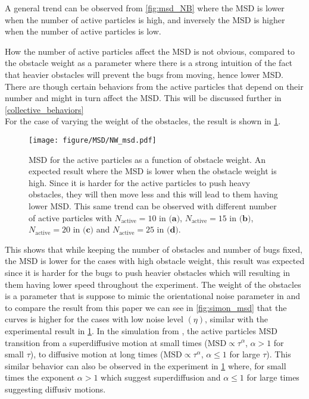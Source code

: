A general trend can be observed from \cref{fig:msd_NB} where the MSD is lower 
when the number of active particles is high, and inversely the MSD is higher 
when the number of active particles is low.

How the number of active particles affect the MSD is not obvious, compared to the 
obstacle weight as a parameter where there is a strong intuition of the fact that 
heavier obstacles will prevent the bugs from moving, hence lower MSD. 
There are though certain behaviors from the active particles that depend on 
their number and might in turn affect the MSD. This will be discussed further in 
\cref{collective_behaviors}\\

For the case of varying the weight of the obstacles, the result is shown in \cref{fig:msd_NW}.

\begin{figure}[htbp]
    \centering
    \texttt{[image: figure/MSD/NW\_msd.pdf]}
    \caption{MSD for the active particles as a function of obstacle weight. An 
    expected result where the MSD is lower when the obstacle weight is high. Since 
    it is harder for the active particles to push heavy obstacles, they will then 
    move less and this will lead to them having lower MSD. This same trend can be observed 
    with different number of active particles with $N_{\text{active}}=10$ in $\textbf{(a)}$, 
    $N_{\text{active}}=15$ in $\textbf{(b)}$, $N_{\text{active}}=20$ in $\textbf{(c)}$ and 
    $N_{\text{active}}=25$ in $\textbf{(d)}$.} 
    \label{fig:msd_NW}
\end{figure}

This shows that while keeping the number of obstacles and number of bugs fixed, the 
MSD is lower for the cases with high obstacle weight, this result was expected 
since it is harder for the bugs to push heavier obstacles which will resulting in them 
having lower speed throughout the experiment. The weight of the obstacles is a parameter 
that is suppose to mimic the orientational noise parameter in \cite{nilsson2017metastable} and to 
compare the result from this paper we can see in \cref{fig:simon_msd} that the 
curves is higher for the cases with low noise level $(\eta)$, similar with the 
experimental result in \cref{fig:msd_NW}. In the simulation from \citeauthor{nilsson2017metastable}, 
the active particles MSD transition from a superdiffusive motion at small times 
($\text{MSD}\propto\tau^{\alpha}$, $\alpha>1$ for small $\tau$), to diffusive motion at long times 
($\text{MSD}\propto\tau^{\alpha}$, $\alpha\leq1$ for large $\tau$). This similar behavior can also 
be observed in the experiment in \cref{fig:msd_NW} where, for small times the exponent $\alpha>1$ which 
suggest superdiffusion and $\alpha\leq1$ for large times suggesting diffusiv motions.


